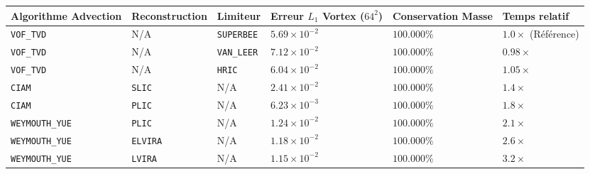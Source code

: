 \documentclass[
  french,
]{article}
\newcounter{none} %
\begin{document}
{\def\LTcaptype{none} %
\begin{longtable}[]{@{}
  >{\raggedright\arraybackslash}p{}
  >{\raggedright\arraybackslash}p{}
  >{\raggedright\arraybackslash}p{}
  >{\raggedright\arraybackslash}p{}
  >{\raggedright\arraybackslash}p{}
  >{\raggedright\arraybackslash}p{}@{}}
\toprule\noalign{}
\begin{minipage}[b]{\linewidth}\raggedright
Algorithme Advection
\end{minipage} & \begin{minipage}[b]{\linewidth}\raggedright
Reconstruction
\end{minipage} & \begin{minipage}[b]{\linewidth}\raggedright
Limiteur
\end{minipage} & \begin{minipage}[b]{\linewidth}\raggedright
Erreur \(L_1\) Vortex (\(64^2\))
\end{minipage} & \begin{minipage}[b]{\linewidth}\raggedright
Conservation Masse
\end{minipage} & \begin{minipage}[b]{\linewidth}\raggedright
Temps relatif
\end{minipage} \\
\midrule\noalign{}
\endhead
\bottomrule\noalign{}
\endlastfoot
\texttt{VOF\_TVD} & N/A & \texttt{SUPERBEE} & \(5.69 \times 10^{-2}\) &
\(100.000\%\) & \(1.0\times\) (Référence) \\
\texttt{VOF\_TVD} & N/A & \texttt{VAN\_LEER} & \(7.12 \times 10^{-2}\) &
\(100.000\%\) & \(0.98\times\) \\
\texttt{VOF\_TVD} & N/A & \texttt{HRIC} & \(6.04 \times 10^{-2}\) &
\(100.000\%\) & \(1.05\times\) \\
\texttt{CIAM} & \texttt{SLIC} & N/A & \(2.41 \times 10^{-2}\) &
\(100.000\%\) & \(1.4\times\) \\
\texttt{CIAM} & \texttt{PLIC} & N/A & \(6.23 \times 10^{-3}\) &
\(100.000\%\) & \(1.8\times\) \\
\texttt{WEYMOUTH\_YUE} & \texttt{PLIC} & N/A & \(1.24 \times 10^{-2}\) &
\(100.000\%\) & \(2.1\times\) \\
\texttt{WEYMOUTH\_YUE} & \texttt{ELVIRA} & N/A & \(1.18 \times 10^{-2}\)
& \(100.000\%\) & \(2.6\times\) \\
\texttt{WEYMOUTH\_YUE} & \texttt{LVIRA} & N/A & \(1.15 \times 10^{-2}\)
& \(100.000\%\) & \(3.2\times\) \\
\end{longtable}
}
\end{document}
